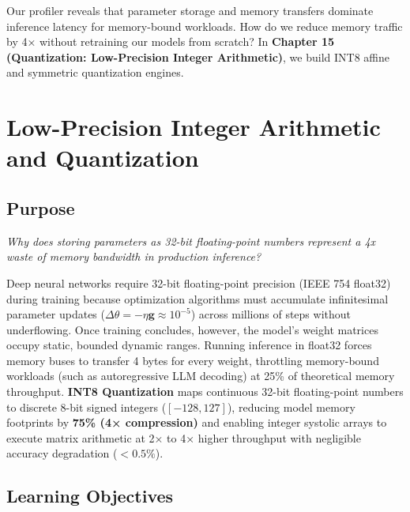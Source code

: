 \documentclass[
  letterpaper,
]{scrbook}
\begin{document}
Our profiler reveals that parameter storage and memory transfers
dominate inference latency for memory-bound workloads. How do we reduce
memory traffic by 4× without retraining our models from scratch? In
\textbf{Chapter 15 (Quantization: Low-Precision Integer Arithmetic)}, we
build INT8 affine and symmetric quantization engines.

\chapter{Low-Precision Integer Arithmetic and
Quantization}\label{low-precision-integer-arithmetic-and-quantization}

\section*{Purpose}\label{purpose-17}


\emph{Why does storing parameters as 32-bit floating-point numbers
represent a 4x waste of memory bandwidth in production inference?}

Deep neural networks require 32-bit floating-point precision (IEEE 754
float32) during training because optimization algorithms must accumulate
infinitesimal parameter updates
(\(\Delta \theta = -\eta \mathbf{g} \approx 10^{-5}\)) across millions
of steps without underflowing. Once training concludes, however, the
model's weight matrices occupy static, bounded dynamic ranges. Running
inference in float32 forces memory buses to transfer 4 bytes for every
weight, throttling memory-bound workloads (such as autoregressive LLM
decoding) at 25\% of theoretical memory throughput. \textbf{INT8
Quantization} maps continuous 32-bit floating-point numbers to discrete
8-bit signed integers (\([-128, 127]\)), reducing model memory
footprints by \textbf{75\% (4× compression)} and enabling integer
systolic arrays to execute matrix arithmetic at 2× to 4× higher
throughput with negligible accuracy degradation (\(<0.5\%\)).

\section{Learning Objectives}\label{learning-objectives-15}
\end{document}
